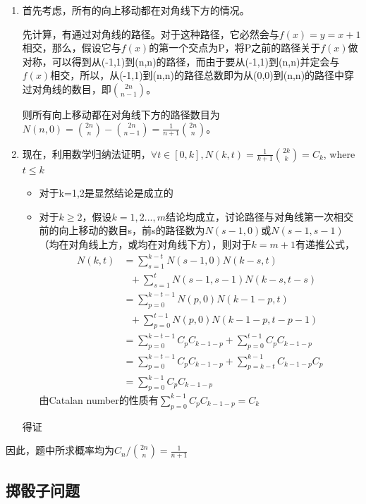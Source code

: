 \documentclass[12pt, a4paper]{article}
\begin{document}
\begin{enumerate}
    \item 首先考虑，所有的向上移动都在对角线下方的情况。\par
    先计算，有通过对角线的路径。对于这种路径，它必然会与$f(x) = y = x + 1$相交，那么，假设它与$f(x)$的第一个交点为P，将P之前的路径关于$f(x)$做对称，可以得到从(-1,1)到(n,n)的路径，而由于要从(-1,1)到(n,n)并定会与$f(x)$相交，所以，从(-1,1)到(n,n)的路径总数即为从(0,0)到(n,n)的路径中穿过对角线的数目，即$\binom{2n}{n-1}$。\par
    则所有向上移动都在对角线下方的路径数目为$N(n,0)=\binom{2n}{n}-\binom{2n}{n-1} = \frac{1}{n+1}\binom{2n}{n}$。\cite{Diagonal_travel}\par
    \item 现在，利用数学归纳法证明，$\forall t\in[0,k], N(k,t)=\frac{1}{k+1}\binom{2k}{k}=C_k$, where $t \leq k$
    \begin{itemize}
        \item 对于k=1,2是显然结论是成立的
        \item 对于$k \geq 2$，假设$k=1,2...,m$结论均成立，讨论路径与对角线第一次相交前的向上移动的数目s，前s的路径数为$N(s-1,0)$或$N(s-1,s-1)$（均在对角线上方，或均在对角线下方），则对于$k=m+1$有递推公式，
        \begin{displaymath}
            \begin{aligned}
                N(k,t)&=\sum^{k-t}_{s=1}{N(s-1,0)N(k-s,t)}\\&\text{ \ \ }+\sum^{t}_{s=1}{N(s-1,s-1)N(k-s,t-s)}\\
                    &=\sum^{k-t-1}_{p=0}{N(p,0)N(k-1-p,t)}\\&\text{ \ \ }+\sum^{t-1}_{p=0}{N(p,0)N(k-1-p,t-p-1)}\\
                    &=\sum^{k-t-1}_{p=0}{C_pC_{k-1-p}}+\sum^{t-1}_{p=0}{C_pC_{k-1-p}}\\
                    &=\sum^{k-t-1}_{p=0}{C_pC_{k-1-p}}+\sum^{k-1}_{p=k-t}{C_{k-1-p}C_p}\\
                    &=\sum^{k-1}_{p=0}{C_pC_{k-1-p}}
            \end{aligned}
        \end{displaymath}
        由Catalan number的性质有$\sum^{k-1}_{p=0}{C_pC_{k-1-p}}=C_k$        
    \end{itemize}
    得证
\end{enumerate}
因此，题中所求概率均为${C_n}/{\binom{2n}{n}}=\frac{1}{n+1}$

\subsection{掷骰子问题}
\end{document}
